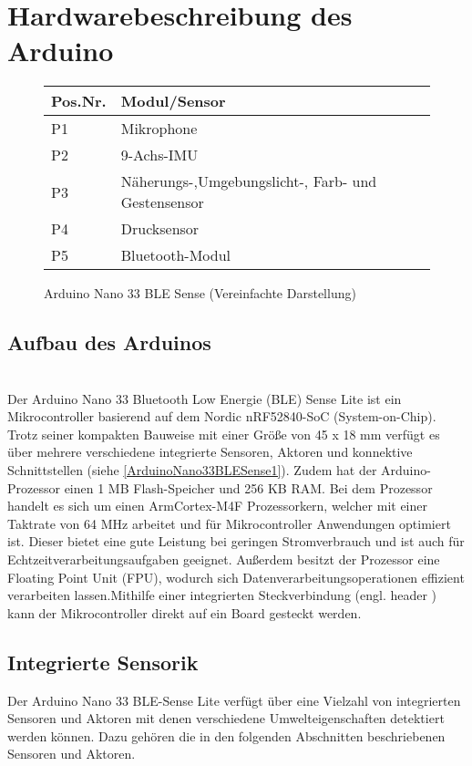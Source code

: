 
\chapter{Hardwarebeschreibung des Arduino}
\begin{figure}[htb]
		
		\caption{Arduino Nano 33 BLE Sense (Vereinfachte Darstellung)} \label{ArduinoNano33BLESense1}
		\begin{tabularx}{\textwidth}{|p{1.5cm}|X|}
			\hline
			\textbf{Pos.Nr.} & \textbf{Modul/Sensor} \\
			\hline
			P1 & Mikrophone \\
			\hline
			P2 & 9-Achs-IMU \\
			\hline
			P3 & Näherungs-,Umgebungslicht-, Farb- und Gestensensor \\
			\hline
			P4 & Drucksensor \\
			\hline
			P5 & Bluetooth-Modul \\
			\hline
		\end{tabularx}
		 \label{ArduinoNano33BLESense2}
\end{figure}
\section{Aufbau des Arduinos}
\cite{Ard.2024}
\\
Der Arduino Nano 33 Bluetooth Low Energie (BLE) Sense Lite ist ein Mikrocontroller basierend auf dem Nordic nRF52840-SoC (System-on-Chip). Trotz seiner kompakten Bauweise mit einer Größe von 45 x 18 mm verfügt es über mehrere verschiedene integrierte Sensoren, Aktoren und konnektive Schnittstellen (siehe \autoref{ArduinoNano33BLESense1}). Zudem hat der Arduino-Prozessor einen 1 MB Flash-Speicher und 256 KB RAM. Bei dem Prozessor handelt es sich um einen Arm\textregistered Cortex-M4F Prozessorkern, welcher mit einer Taktrate von 64 MHz arbeitet und für Mikrocontroller Anwendungen optimiert ist. Dieser bietet eine gute Leistung bei geringen Stromverbrauch und ist auch für Echtzeitverarbeitungsaufgaben geeignet. Außerdem besitzt der Prozessor eine Floating Point Unit (FPU), wodurch sich Datenverarbeitungsoperationen effizient verarbeiten lassen.Mithilfe einer integrierten Steckverbindung (engl. \glqq header \grqq) kann der Mikrocontroller direkt auf ein Board gesteckt werden. \cite{Arm.2020}

\section{Integrierte Sensorik}
Der Arduino Nano 33 BLE-Sense Lite verfügt über eine Vielzahl von integrierten Sensoren und Aktoren mit denen verschiedene Umwelteigenschaften detektiert werden können. Dazu gehören die in den folgenden Abschnitten beschriebenen Sensoren und Aktoren.
